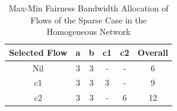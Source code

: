 \documentclass[10pt,journal,compsoc]{IEEEtran}
\begin{document}

\begin{table}[!t]
\renewcommand{\arraystretch}{1}
\caption{Max-Min Fairness Bandwidth Allocation of Flows of the Sparse Case in the Homogeneous Network}
\label{table:homoSparse}
\centering
\begin{tabularx}{.35\textwidth}{c||c|c|c|c|c}
\hline
\textbf{Selected Flow} & \textbf{a} & \textbf{b} & \textbf{c1} & \textbf{c2} & \textbf{Overall}\\
\hline
Nil &3&3&-&-&6\\
\hline
c1 &3&3&3&-&9\\
\hline
c2 &3&3&-&6&12\\
\hline
\end{tabularx}
\end{table}
\end{document}
